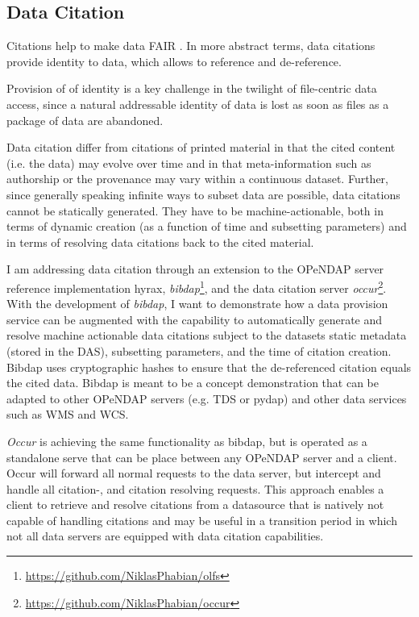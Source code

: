\documentclass[a4paper,10pt]{article}
\begin{document}
\newpage
\subsection{Data Citation}
Citations help to make data \acrfull{FAIR} \citep{Wilkinson2016}. In more abstract terms, data citations provide identity to data, which allows to reference and de-reference.

Provision of of identity is a key challenge in the twilight of file-centric data access, since a natural addressable identity of data is lost as soon as files as a package of data are abandoned.



Data citation differ from citations of printed material in that the cited content (i.e. the data) may evolve over time and in that meta-information such as authorship or the provenance may vary within a continuous dataset. Further, since generally speaking infinite ways to subset data are possible, data citations cannot be statically generated. They have to be machine-actionable, both in terms of dynamic creation (as a function of time and subsetting parameters) and in terms of resolving data citations back to the cited material.

I am addressing data citation through an extension to the OPeNDAP server reference implementation hyrax, \textit{bibdap}\footnote{\url{https://github.com/NiklasPhabian/olfs}},
and the data citation server \textit{occur}\footnote{\url{https://github.com/NiklasPhabian/occur}}. 
With the development of \textit{bibdap}, I want to demonstrate how a data provision service can be augmented with the capability to automatically generate and resolve machine actionable data citations subject to the datasets static metadata (stored in the \gls{DAS}), subsetting parameters, and the time of citation creation. Bibdap uses cryptographic hashes to ensure that the de-referenced citation equals the cited data. Bibdap is meant to be a concept demonstration that can be adapted to other OPeNDAP servers (e.g. TDS or pydap) and other data services such as \gls{WMS} and \gls{WCS}.

\textit{Occur} is achieving the same functionality as bibdap, but is operated as a standalone serve that can be place between any OPeNDAP server and a client. Occur will forward all normal requests to the data server, but intercept and handle all citation-, and citation resolving requests. This approach enables a client to retrieve and resolve citations from a datasource that is natively not capable of handling citations and may be useful in a transition period in which not all data servers are equipped with data citation capabilities.
\end{document}
